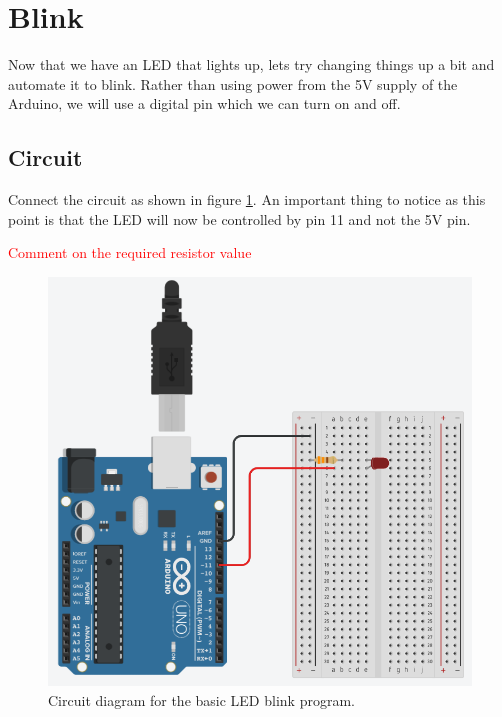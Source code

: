 \documentclass[12pt]{article}
\begin{document}
	\section{Blink}
	
	Now that we have an LED that lights up, lets try changing things up a bit and automate it to blink. Rather than using power from the 5V supply of the Arduino, we will use a digital pin which we can turn on and off.
	
	\subsection{Circuit}
	
	Connect the circuit as shown in figure \ref{fig:circuit_blink}. An important thing to notice as this point is that the LED will now be controlled by pin 11 and not the 5V pin.
	
	\textcolor{red}{Comment on the required resistor value}
	
	\begin{figure}[H]
		\begin{center}
			\includegraphics[scale=0.5]{blink_circuit}
			\caption{Circuit diagram for the basic LED blink program.}
			\label{fig:circuit_blink}
		\end{center}
	\end{figure}
\end{document}
